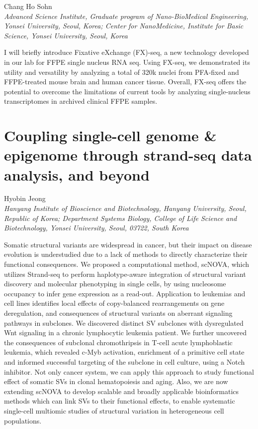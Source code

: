 \begin{center}
Chang Ho Sohn \\
\vspace{0.2cm}
\textit{Advanced Science Institute, Graduate program of Nano-BioMedical Engineering, Yonsei University, Seoul, Korea; Center for NanoMedicine, Institute for Basic Science, Yonsei University, Seoul, Korea} \\
\end{center}

\noindent
I will briefly introduce Fixative eXchange (FX)-seq, a new technology developed in our lab for FFPE single nucleus RNA seq. Using FX-seq, we demonstrated its utility and versatility by analyzing a total of 320k nuclei from PFA-fixed and FFPE-treated mouse brain and human cancer tissue. Overall, FX-seq offers the potential to overcome the limitations of current tools by analyzing single-nucleus transcriptomes in archived clinical FFPE samples.
\newpage

\section*{Coupling single-cell genome \& epigenome through strand-seq data analysis, and beyond}

\begin{center}
Hyobin Jeong \\
\vspace{0.2cm}
\textit{Hanyang Institute of Bioscience and Biotechnology, Hanyang University, Seoul, Republic of Korea; Department Systems Biology, College of Life Science and Biotechnology, Yonsei University, Seoul, 03722, South Korea
} \\
\end{center}

\noindent
Somatic structural variants are widespread in cancer, but their impact on disease evolution is understudied due to a lack of methods to directly characterize their functional consequences. We proposed a computational method, scNOVA, which utilizes Strand-seq to perform haplotype-aware integration of structural variant discovery and molecular phenotyping in single cells, by using nucleosome occupancy to infer gene expression as a read-out. Application to leukemias and cell lines identifies local effects of copy-balanced rearrangements on gene deregulation, and consequences of structural variants on aberrant signaling pathways in subclones. We discovered distinct SV subclones with dysregulated Wnt signaling in a chronic lymphocytic leukemia patient. We further uncovered the consequences of subclonal chromothripsis in T-cell acute lymphoblastic leukemia, which revealed c-Myb activation, enrichment of a primitive cell state and informed successful targeting of the subclone in cell culture, using a Notch inhibitor. Not only cancer system, we can apply this approach to study functional effect of somatic SVs in clonal hematopoiesis and aging. Also, we are now extending scNOVA to develop scalable and broadly applicable bioinformatics methods which can link SVs to their functional effects, to enable systematic single-cell multiomic studies of structural variation in heterogeneous cell populations.
\newpage

